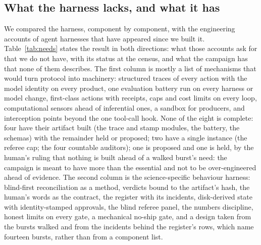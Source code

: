 \subsection{What the harness lacks, and what it has} \label{sec:lacks}

We compared the harness, component by component, with the engineering
accounts of agent harnesses that have appeared since we built it.
Table~\ref{tab:needs} states the result in both directions: what those
accounts ask for that we do not have, with its status at the census, and
what the campaign has that none of them describes. The first column is
mostly a list of mechanisms that would turn protocol into machinery:
structured traces of every action with the model identity on every
product, one evaluation battery run on every harness or model change,
first-class actions with receipts, caps and cost limits on every loop,
computational sensors ahead of inferential ones, a sandbox for producers,
and interception points beyond the one tool-call hook. None of the eight
is complete: four have their artifact built (the trace and stamp modules,
the battery, the schemas) with the remainder held or proposed; two have a
single instance (the referee cap; the four countable auditors); one is
proposed and one is held, by the human's ruling that nothing is built
ahead of a walked burst's need: the campaign is meant to have more than
the essential and not to be over-engineered ahead of evidence. The second
column is the science-specific behaviour harness: blind-first
reconciliation as a method, verdicts bound to the artifact's hash, the
human's words as the contract, the register with its incidents, disk-derived
state with identity-stamped approvals, the blind referee panel, the numbers
discipline, honest limits on every gate, a mechanical no-ship gate, and a
design taken from the bursts walked and from the incidents behind the
register's rows, which name fourteen bursts, rather than from a component
list.

